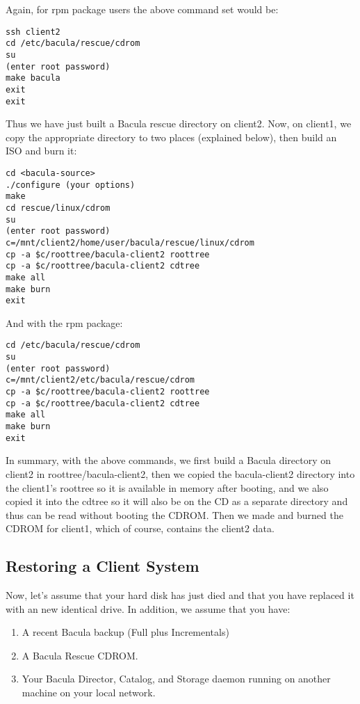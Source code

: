 Again, for rpm package users the above command set would be: 

\footnotesize
\begin{verbatim}
ssh client2
cd /etc/bacula/rescue/cdrom
su
(enter root password)
make bacula
exit
exit
\end{verbatim}
\normalsize

Thus we have just built a Bacula rescue directory on client2. Now, on client1,
we copy the appropriate directory to two places (explained below), then build
an ISO and burn it: 

\footnotesize
\begin{verbatim}
cd <bacula-source>
./configure (your options)
make
cd rescue/linux/cdrom
su
(enter root password)
c=/mnt/client2/home/user/bacula/rescue/linux/cdrom
cp -a $c/roottree/bacula-client2 roottree
cp -a $c/roottree/bacula-client2 cdtree
make all
make burn
exit
\end{verbatim}
\normalsize

And with the rpm package: 

\footnotesize
\begin{verbatim}
cd /etc/bacula/rescue/cdrom
su
(enter root password)
c=/mnt/client2/etc/bacula/rescue/cdrom
cp -a $c/roottree/bacula-client2 roottree
cp -a $c/roottree/bacula-client2 cdtree
make all
make burn
exit
\end{verbatim}
\normalsize

In summary, with the above commands, we first build a Bacula directory on
client2 in roottree/bacula-client2, then we copied the bacula-client2
directory into the client1's roottree so it is available in memory after
booting, and we also copied it into the cdtree so it will also be on the CD as
a separate directory and thus can be read without booting the CDROM. Then we
made and burned the CDROM for client1, which of course, contains the client2
data. 
\label{restore}

\subsection*{Restoring a Client System}

Now, let's assume that your hard disk has just died and that you have replaced
it with an new identical drive. In addition, we assume that you have: 

\begin{enumerate}
\item A recent Bacula backup (Full plus Incrementals)  
\item A Bacula Rescue CDROM.  
\item Your Bacula Director, Catalog, and Storage daemon running  on another
   machine on your local network. 
   \end{enumerate}

